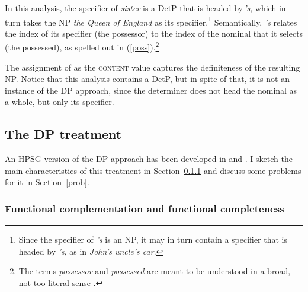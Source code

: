 \documentclass[output=paper,biblatex,babelshorthands,newtxmath,draftmode,colorlinks,citecolor=brown]{langscibook}
\begin{document}
In this analysis, the specifier of \emph{sister} is a DetP that is headed by\,\emph{'s},  
which in turn takes the NP \emph{the Queen of England} as its specifier.\footnote{Since the 
specifier of \emph{'s} is an NP, it may in turn contain a specifier that is headed 
by \emph{'s}, as in \emph{John's uncle's car}.}
Semantically, \emph{'s} relates the index of its specifier (the possessor) to the index
of the nominal that it selects (the possessed), as spelled out in (\ref{poss}).\footnote{The
terms \emph{possessor} and \emph{possessed} are meant to be understood in a broad, not-too-literal 
sense \citep[--9]{Nerbonne92}.}     

\begin{exe} 
\ex\label{poss}
\end{exe}

\noindent
The assignment of  as the \textsc{content} value captures 
the definiteness of the resulting NP. Notice that this analysis contains a DetP, 
but in spite of that, it is not an instance of the DP approach, since the 
determiner does not head the nominal as a whole, but only its specifier. 


\subsection{The DP treatment} 
\label{dpt} 


An HPSG version of the DP approach has been developed in \citet{Netter94} and 
\citet{Netter96a}. I sketch the main characteristics of this treatment in Section~\ref{compl}
and discuss some problems for it in Section~\ref{prob}. 


\subsubsection{Functional complementation and functional completeness} 
\label{compl} 
\end{document}
